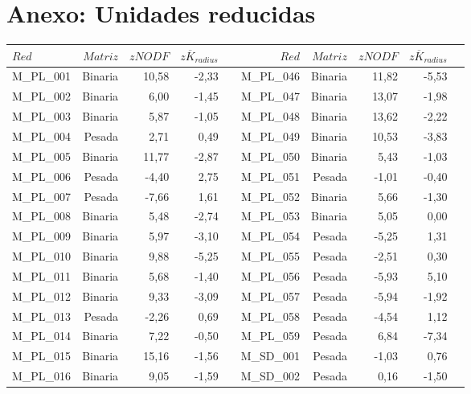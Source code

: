 \section{Anexo: Unidades reducidas}
\label{ESTATICA_ANEXO_zscores}
\begin{table}[ht!]
\fontsize{2.5mm}{2.5mm}\selectfont
  \centering
    \begin{tabular}{lrrrrrrrrr}
    \toprule
    $Red$  & $Matriz$ & $zNODF$ & $z\overline K_{radius}$ &  &  $Red$  & $Matriz$ & $zNODF$ & $z\overline K_{radius}$ \\
    \midrule
    M\_PL\_001 & Binaria & 10,58 & -2,33 &      & M\_PL\_046 & Binaria & 11,82 & -5,53 \\
    M\_PL\_002 & Binaria & 6,00 & -1,45 &      & M\_PL\_047 & Binaria & 13,07 & -1,98 \\
    M\_PL\_003 & Binaria & 5,87 & -1,05 &      & M\_PL\_048 & Binaria & 13,62 & -2,22 \\
    M\_PL\_004 & Pesada & 2,71 & 0,49 &      & M\_PL\_049 & Binaria & 10,53 & -3,83 \\
    M\_PL\_005 & Binaria & 11,77 & -2,87 &      & M\_PL\_050 & Binaria & 5,43 & -1,03 \\
    M\_PL\_006 & Pesada & -4,40 & 2,75 &      & M\_PL\_051 & Pesada & -1,01 & -0,40 \\
    M\_PL\_007 & Pesada & -7,66 & 1,61 &      & M\_PL\_052 & Binaria & 5,66 & -1,30 \\
    M\_PL\_008 & Binaria & 5,48 & -2,74 &      & M\_PL\_053 & Binaria & 5,05 & 0,00 \\
    M\_PL\_009 & Binaria & 5,97 & -3,10 &      & M\_PL\_054 & Pesada & -5,25 & 1,31 \\
    M\_PL\_010 & Binaria & 9,88 & -5,25 &      & M\_PL\_055 & Pesada & -2,51 & 0,30 \\
    M\_PL\_011 & Binaria & 5,68 & -1,40 &      & M\_PL\_056 & Pesada & -5,93 & 5,10 \\
    M\_PL\_012 & Binaria & 9,33 & -3,09 &      & M\_PL\_057 & Pesada & -5,94 & -1,92 \\
    M\_PL\_013 & Pesada & -2,26 & 0,69 &      & M\_PL\_058 & Pesada & -4,54 & 1,12 \\
    M\_PL\_014 & Binaria & 7,22 & -0,50 &      & M\_PL\_059 & Pesada & 6,84 & -7,34 \\
    M\_PL\_015 & Binaria & 15,16 & -1,56 &      & M\_SD\_001 & Pesada & -1,03 & 0,76 \\
    M\_PL\_016 & Binaria & 9,05 & -1,59 &      & M\_SD\_002 & Pesada & 0,16 & -1,50 \\

\end{tabular}
\end{table}
